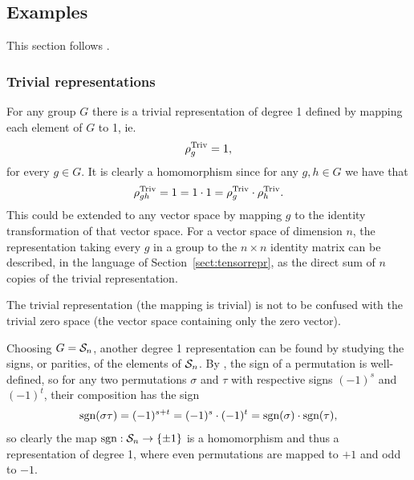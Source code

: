 \subsection{Examples}\label{sect:basicreprs}

This section follows \cite[1.2.]{Serre}.

\subsubsection{Trivial representations}


\begin{example}\label{example:trivrepr}
	For any group $G$ there is a trivial representation of degree 1 defined by mapping each element of $G$ to 1, ie.
	\begin{align*}
		\rho_g^{\text{Triv}} = 1,
	\end{align*}
	for every $g \in G$. It is clearly a homomorphism since for any $g,h \in G$ we have that
	\begin{align*}
		\rho_{gh}^{\text{Triv}} = 1 = 1 \cdot 1 = \rho_g^{\text{Triv}} \cdot \rho_h^{\text{Triv}}.
	\end{align*}
	This could be extended to any vector space by mapping $g$ to the identity transformation of that vector space. For a vector space of dimension $n$, the representation taking every $g$ in a group to the $n \times n$ identity matrix can be described, in the language of Section~\ref{sect:tensorrepr}, as the direct sum of $n$ copies of the trivial representation.
\end{example}

\begin{note}
	The trivial representation (the mapping is trivial) is not to be confused with the trivial zero space (the vector space containing only the zero vector).
\end{note}

\begin{example}\label{example:altrepr}
	Choosing $G = \mathcal{S}_n$, another degree 1 representation can be found by studying the signs, or parities, of the elements of $\mathcal{S}_n$. By \cite[Thm.12.6.1.]{Biggs}, the sign of a permutation is well-defined, so for any two permutations $\sigma$ and $\tau$ with respective signs $(-1)^s$ and $(-1)^t$, their composition has the sign
	\begin{align*}
		\text{sgn}(\sigma\tau) = (-1)^{s+t} = (-1)^s \cdot (-1)^t = \text{sgn} (\sigma) \cdot \text{sgn} (\tau),
	\end{align*}
	so clearly the map $\text{sgn}: \mathcal{S}_n \rightarrow \{\pm 1\}$ is a homomorphism and thus a representation of degree 1, where even permutations are mapped to $+1$ and odd to $-1$.
\end{example}

